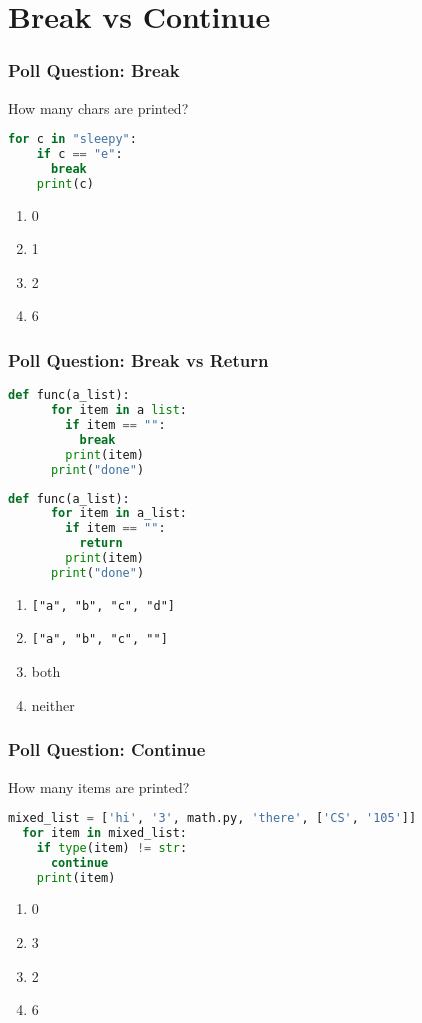 \documentclass{beamer}
\begin{document}
\section{Break vs Continue}
%
%
\begin{frame}[fragile]
  \frametitle{Poll Question: Break}
  How many chars are printed?
  \begin{lstlisting}[language=Python, autogobble]
  for c in "sleepy":
    if c == "e":
      break
    print(c)
  \end{lstlisting}
  \vfill
  \begin{enumerate}[A]
    \item 0
    \item 1
    \item 2
    \item 6
  \end{enumerate}
\end{frame}

%
%
\begin{frame}[fragile]
  \frametitle{Poll Question: Break vs Return}
  \centering
  \begin{minipage}{0.45\textwidth}
    \begin{lstlisting}[language=Python, autogobble]
    def func(a_list):
      for item in a list:
        if item == "":
          break
        print(item)
      print("done")
    \end{lstlisting}
  \end{minipage}
  \hfill
  \begin{minipage}{0.45\textwidth}
    \begin{lstlisting}[language=Python, autogobble]
    def func(a_list):
      for item in a_list:
        if item == "":
          return 
        print(item)
      print("done")
    \end{lstlisting}
  \end{minipage}
  \vfill
  \begin{enumerate}[A]
    \item \lstinline|["a", "b", "c", "d"]|
    \item \lstinline|["a", "b", "c", ""]|
    \item both
    \item neither
  \end{enumerate}
\end{frame}

%
%
\begin{frame}[fragile]
  \frametitle{Poll Question: Continue}
  How many items are printed?
  \begin{lstlisting}[language=Python, autogobble]
  mixed_list = ['hi', '3', math.py, 'there', ['CS', '105']]
  for item in mixed_list:
    if type(item) != str:
      continue
    print(item)
  \end{lstlisting}
  \vfill
  \begin{enumerate}[A]
    \item 0
    \item 3
    \item 2
    \item 6
  \end{enumerate}
\end{frame}
\end{document}
